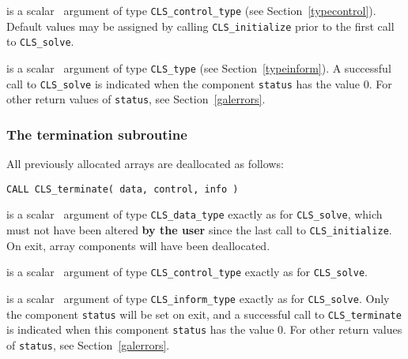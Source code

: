 \documentclass{galahad}
\newcommand{\packagename}{CLS}
\begin{document}
\begin{description}
 is a scalar \intentin\ argument of type
{\tt \packagename\_control\_type}
(see Section~\ref{typecontrol}). Default values may be assigned by calling
{\tt \packagename\_initialize} prior to the first call to
{\tt \packagename\_solve}.

 is a scalar \intentout\ argument of type {\tt \packagename\_type}
(see Section~\ref{typeinform}). A successful call to
{\tt \packagename\_solve}
is indicated when the  component {\tt status} has the value 0.
For other return values of {\tt status}, see Section~\ref{galerrors}.


\end{description}


\subsubsection{The  termination subroutine}
All previously allocated arrays are deallocated as follows:
\vspace*{1mm}

\hspace{8mm}
{\tt CALL \packagename\_terminate( data, control, info )}

\vspace*{-3mm}
\begin{description}

 is a scalar \intentinout\ argument of type
{\tt \packagename\_data\_type}
exactly as for
{\tt \packagename\_solve},
which must not have been altered {\bf by the user} since the last call to
{\tt \packagename\_initialize}.
On exit, array components will have been deallocated.

 is a scalar \intentin\ argument of type
{\tt \packagename\_control\_type}
exactly as for
{\tt \packagename\_solve}.

 is a scalar \intentout\ argument of type
{\tt \packagename\_inform\_type}
exactly as for
{\tt \packagename\_solve}.
Only the component {\tt status} will be set on exit, and a
successful call to
{\tt \packagename\_terminate}
is indicated when this  component {\tt status} has the value 0.
For other return values of {\tt status}, see Section~\ref{galerrors}.

\end{description}
\end{document}
